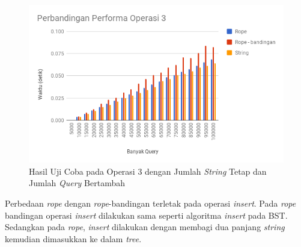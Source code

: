 \begin{figure}
\centerline{ \includegraphics[scale=0.45]{assets/images/operasi3-query.png}}
\caption{Hasil Uji Coba pada Operasi 3 dengan Jumlah \textit{String} Tetap dan Jumlah \textit{Query} Bertambah}
\label{figure:operasi3query}
\end{figure}

Perbedaan \textit{rope} dengan \textit{rope}-bandingan terletak pada operasi \textit{insert}. Pada \textit{rope} bandingan operasi \textit{insert} dilakukan sama seperti algoritma \textit{insert} pada BST. Sedangkan pada \textit{rope}, \textit{insert} dilakukan dengan membagi dua panjang \textit{string} kemudian dimasukkan ke dalam \textit{tree}.

